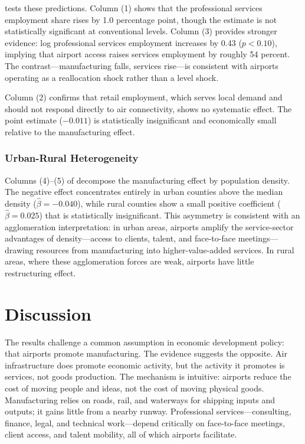 \documentclass[12pt]{article}
\begin{document}
 tests these predictions. Column (1) shows that the professional services employment share rises by 1.0 percentage point, though the estimate is not statistically significant at conventional levels. Column (3) provides stronger evidence: log professional services employment increases by 0.43 ($p < 0.10$), implying that airport access raises services employment by roughly 54 percent. The contrast---manufacturing falls, services rise---is consistent with airports operating as a reallocation shock rather than a level shock.

Column (2) confirms that retail employment, which serves local demand and should not respond directly to air connectivity, shows no systematic effect. The point estimate ($-0.011$) is statistically insignificant and economically small relative to the manufacturing effect.

\subsubsection*{Urban-Rural Heterogeneity} Columns (4)--(5) of  decompose the manufacturing effect by population density. The negative effect concentrates entirely in urban counties above the median density ($\hat{\beta} = -0.040$), while rural counties show a small positive coefficient ($\hat{\beta} = 0.025$) that is statistically insignificant. This asymmetry is consistent with an agglomeration interpretation: in urban areas, airports amplify the service-sector advantages of density---access to clients, talent, and face-to-face meetings---drawing resources from manufacturing into higher-value-added services. In rural areas, where these agglomeration forces are weak, airports have little restructuring effect.

\section{Discussion}

The results challenge a common assumption in economic development policy: that airports promote manufacturing. The evidence suggests the opposite. Air infrastructure does promote economic activity, but the activity it promotes is services, not goods production. The mechanism is intuitive: airports reduce the cost of moving people and ideas, not the cost of moving physical goods. Manufacturing relies on roads, rail, and waterways for shipping inputs and outputs; it gains little from a nearby runway. Professional services---consulting, finance, legal, and technical work---depend critically on face-to-face meetings, client access, and talent mobility, all of which airports facilitate.
\end{document}
